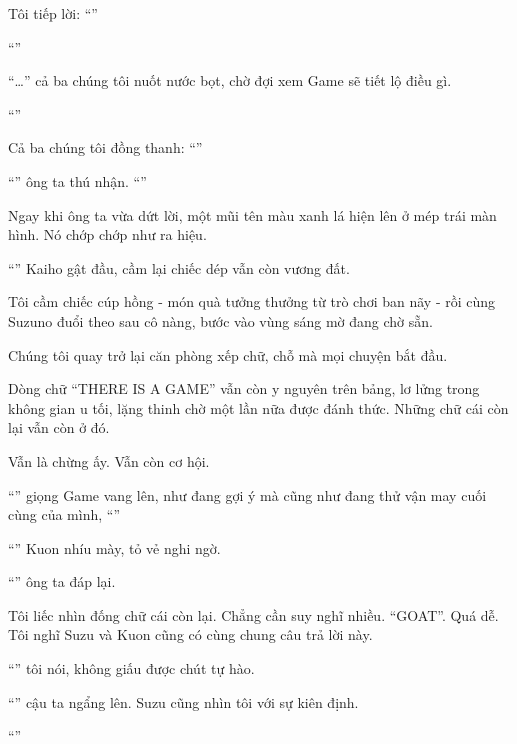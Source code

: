 \documentclass[../main.tex]{subfiles}
\begin{document}
Tôi tiếp lời: ``''

``''

``\dots'' cả ba chúng tôi nuốt nước bọt, chờ đợi xem Game sẽ tiết lộ điều gì.

``''

Cả ba chúng tôi đồng thanh: ``''

``'' ông ta thú nhận. ``''

Ngay khi ông ta vừa dứt lời, một mũi tên màu xanh lá hiện lên ở mép trái màn hình. Nó chớp chớp như ra hiệu.

``'' Kaiho gật đầu, cầm lại chiếc dép vẫn còn vương đất.

Tôi cầm chiếc cúp hồng - món quà tưởng thưởng từ trò chơi ban nãy - rồi cùng Suzuno đuổi theo sau cô nàng, bước vào vùng sáng mờ đang chờ sẵn.

\ct


Chúng tôi quay trở lại căn phòng xếp chữ, chỗ mà mọi chuyện bắt đầu.

Dòng chữ ``THERE IS A GAME'' vẫn còn y nguyên trên bảng, lơ lửng trong không gian u tối, lặng thinh chờ một lần nữa được đánh thức. Những chữ cái còn lại vẫn còn ở đó.

Vẫn là chừng ấy. Vẫn còn cơ hội.

``'' giọng Game vang lên, như đang gợi ý mà cũng như đang thử vận may cuối cùng của mình, ``''

``'' Kuon nhíu mày, tỏ vẻ nghi ngờ.

``'' ông ta đáp lại.

Tôi liếc nhìn đống chữ cái còn lại. Chẳng cần suy nghĩ nhiều. ``GOAT''. Quá dễ. Tôi nghĩ Suzu và Kuon cũng có cùng chung câu trả lời này.

``'' tôi nói, không giấu được chút tự hào.

``'' cậu ta ngẩng lên. Suzu cũng nhìn tôi với sự kiên định.

``''
\end{document}
